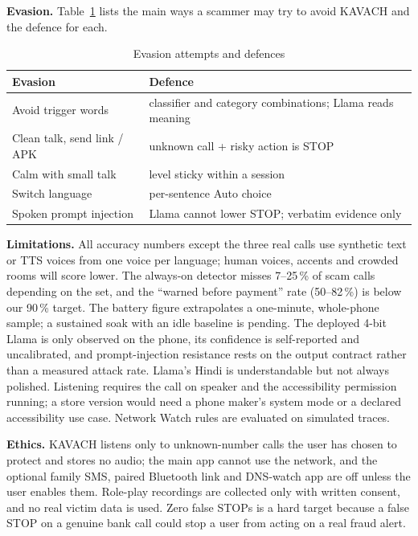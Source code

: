 \documentclass[conference]{IEEEtran}
\begin{document}
\textbf{Evasion.} Table~\ref{tab:evasion} lists the main ways a scammer may try to avoid KAVACH and the defence for each.

\begin{table}[t]
\caption{Evasion attempts and defences}
\label{tab:evasion}
\centering
\footnotesize
\setlength{\tabcolsep}{3pt}
\begin{tabular}{@{}p{}p{}@{}}
\toprule
Evasion & Defence \\
\midrule
Avoid trigger words & classifier and category combinations; Llama reads meaning \\
Clean talk, send link / APK & unknown call + risky action is STOP \\
Calm with small talk & level sticky within a session \\
Switch language & per-sentence Auto choice \\
Spoken prompt injection & Llama cannot lower STOP; verbatim evidence only \\
\bottomrule
\end{tabular}
\end{table}

\textbf{Limitations.} All accuracy numbers except the three real calls use synthetic text or TTS voices from one voice per language; human voices, accents and crowded rooms will score lower. The always-on detector misses 7--25\,\% of scam calls depending on the set, and the ``warned before payment'' rate (50--82\,\%) is below our 90\,\% target. The battery figure extrapolates a one-minute, whole-phone sample; a sustained soak with an idle baseline is pending. The deployed 4-bit Llama is only observed on the phone, its confidence is self-reported and uncalibrated, and prompt-injection resistance rests on the output contract rather than a measured attack rate. Llama's Hindi is understandable but not always polished. Listening requires the call on speaker and the accessibility permission running; a store version would need a phone maker's system mode or a declared accessibility use case. Network Watch rules are evaluated on simulated traces.

\textbf{Ethics.} KAVACH listens only to unknown-number calls the user has chosen to protect and stores no audio; the main app cannot use the network, and the optional family SMS, paired Bluetooth link and DNS-watch app are off unless the user enables them. Role-play recordings are collected only with written consent, and no real victim data is used. Zero false STOPs is a hard target because a false STOP on a genuine bank call could stop a user from acting on a real fraud alert.
\end{document}
